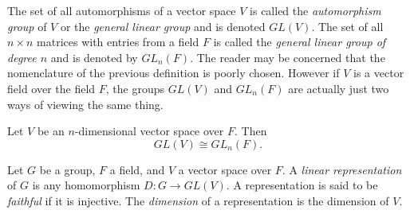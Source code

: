 The set of all automorphisms of a vector space $V$ is called
the {\it automorphism group} of $V$ or the 
{\it general linear group} and is
denoted $GL(V)$. The set of all $n\times n$ matrices with entries from 
a field $F$ is called the {\it general linear group of degree $n$} and 
is denoted by $GL_{n}(F)$.
The reader may be concerned that the nomenclature
of the previous definition is poorly chosen. However if $V$ is a vector field
over the field $F$, the groups $GL(V)$ and $GL_{n}(F)$ are actually just two
ways of viewing the same thing. 

\begin{theorem}{}{}
  Let $V$ be an $n$-dimensional vector space over $F$. Then 
  $$GL(V)\cong GL_{n}(F).$$
\end{theorem}

Let $G$ be a group, $F$ a field, and $V$ a vector space over
$F$. A {\it linear representation} of $G$ 
is any homomorphism $D:G\to GL(V)$. A representation is said to be 
{\it faithful} if it is injective. 
The {\it dimension} of a representation 
is the dimension of $V$.

